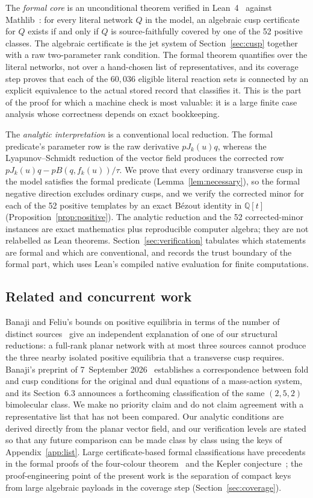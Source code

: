 \documentclass[11pt,a4paper]{article}
\theoremstyle{plain}
\theoremstyle{definition}
\theoremstyle{remark}
\numberwithin{equation}{section}
\newcommand{\Q}{\mathbb{Q}}
\begin{document}
The \emph{formal core} is an unconditional theorem verified in Lean~4~\citep{Lean4} against Mathlib~\citep{mathlib2020}: for every literal network $Q$ in the model, an algebraic cusp certificate for $Q$ exists if and only if $Q$ is source-faithfully covered by one of the 52 positive classes. The algebraic certificate is the jet system of Section~\ref{sec:cusp} together with a raw two-parameter rank condition. The formal theorem quantifies over the literal networks, not over a hand-chosen list of representatives, and its coverage step proves that each of the $60{,}036$ eligible literal reaction sets is connected by an explicit equivalence to the actual stored record that classifies it. This is the part of the proof for which a machine check is most valuable: it is a large finite case analysis whose correctness depends on exact bookkeeping.

The \emph{analytic interpretation} is a conventional local reduction. The formal predicate's parameter row is the raw derivative $pJ_k(u)q$, whereas the Lyapunov--Schmidt reduction of the vector field produces the corrected row $pJ_k(u)q-pB(q,f_k(u))/\tau$. We prove that every ordinary transverse cusp in the model satisfies the formal predicate (Lemma~\ref{lem:necessary}), so the formal negative direction excludes ordinary cusps, and we verify the corrected minor for each of the 52 positive templates by an exact B\'ezout identity in $\Q[t]$ (Proposition~\ref{prop:positive}). The analytic reduction and the 52 corrected-minor instances are exact mathematics plus reproducible computer algebra; they are not relabelled as Lean theorems. Section~\ref{sec:verification} tabulates which statements are formal and which are conventional, and records the trust boundary of the formal part, which uses Lean's compiled native evaluation for finite computations.

\subsection{Related and concurrent work}
Banaji and Feliu's bounds on positive equilibria in terms of the number of distinct sources~\citep{BF2026} give an independent explanation of one of our structural reductions: a full-rank planar network with at most three sources cannot produce the three nearby isolated positive equilibria that a transverse cusp requires. Banaji's preprint of 7~September 2026~\citep{B2026} establishes a correspondence between fold and cusp conditions for the original and dual equations of a mass-action system, and its Section~6.3 announces a forthcoming classification of the same $(2,5,2)$ bimolecular class. We make no priority claim and do not claim agreement with a representative list that has not been compared. Our analytic conditions are derived directly from the planar vector field, and our verification levels are stated so that any future comparison can be made class by class using the keys of Appendix~\ref{app:list}. Large certificate-based formal classifications have precedents in the formal proofs of the four-colour theorem~\citep{Gonthier2008} and the Kepler conjecture~\citep{Hales2017}; the proof-engineering point of the present work is the separation of compact keys from large algebraic payloads in the coverage step (Section~\ref{sec:coverage}).
\end{document}
